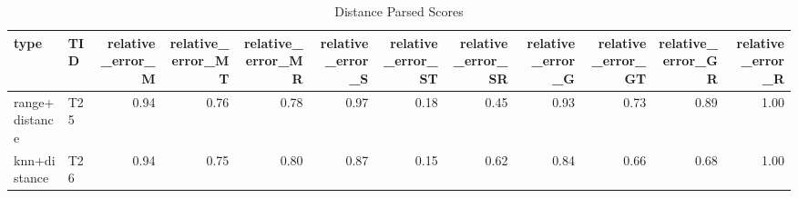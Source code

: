 \begin{table}
\caption{Distance Parsed Scores}
\label{tab:distance_parsed_scores}
\begin{tabular}{llrrrrrrrrrr}
\hline
type & TID & relative\_error\_M & relative\_error\_MT & relative\_error\_MR & relative\_error\_S & relative\_error\_ST & relative\_error\_SR & relative\_error\_G & relative\_error\_GT & relative\_error\_GR & relative\_error\_R \\
\hline
range+distance & T25 & 0.94 & 0.76 & 0.78 & 0.97 & 0.18 & 0.45 & 0.93 & 0.73 & 0.89 & 1.00 \\
knn+distance & T26 & 0.94 & 0.75 & 0.80 & 0.87 & 0.15 & 0.62 & 0.84 & 0.66 & 0.68 & 1.00 \\
\hline
\end{tabular}
\end{table}
